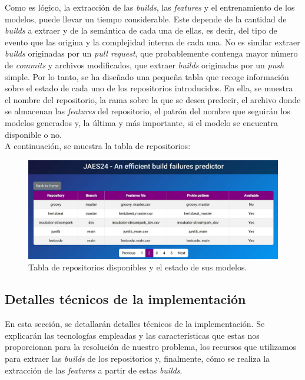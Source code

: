 Como es lógico, la extracción de las \textit{builds}, las \textit{features} y el entrenamiento
de los modelos, puede llevar un tiempo considerable. Este depende de la cantidad de \textit{builds}
a extraer y de la semántica de cada una de ellas, es decir, del tipo de evento que las origina
y la complejidad interna de cada una. No es similar extraer \textit{builds} originadas por un 
\textit{pull request}, que probablemente contenga mayor número de \textit{commits} y archivos 
modificados, que extraer \textit{builds} originadas por un \textit{push} simple. Por lo tanto,
se ha diseñado una pequeña tabla que recoge información sobre el estado de cada uno de los
repositorios introducidos. En ella, se muestra el nombre del repositorio, la rama sobre la que
se desea predecir, el archivo donde se almacenan las \textit{features} del repositorio, el
patrón del nombre que seguirán los modelos generados y, la última y más importante, si el modelo
se encuentra disponible o no.\\

\noindent A continuación, se muestra la tabla de repositorios:

\begin{figure}[H]
    \centering
    \includegraphics[scale=0.3]{images/available-models.pdf}
    \caption{Tabla de repositorios disponibles y el estado de sus modelos.}
    \label{fig:available_models}
\end{figure}

\subsection{Detalles técnicos de la implementación}
En esta sección, se detallarán detalles técnicos de la implementación. Se explicarán las
tecnologías empleadas y las características que estas nos proporcionan para la resolución
de nuestro problema, los recursos que utilizamos para extraer las \textit{builds} de los
repositorios y, finalmente, cómo se realiza la extracción de las \textit{features} a partir de
estas \textit{builds}.

